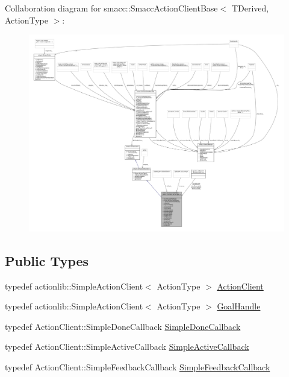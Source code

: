 Collaboration diagram for smacc\+:\+:Smacc\+Action\+Client\+Base$<$ T\+Derived, Action\+Type $>$\+:
\nopagebreak
\begin{figure}[H]
\begin{center}
\leavevmode
\includegraphics[width=350pt]{classsmacc_1_1SmaccActionClientBase__coll__graph}
\end{center}
\end{figure}
\subsection*{Public Types}
\begin{DoxyCompactItemize}
\item 
typedef actionlib\+::\+Simple\+Action\+Client$<$ Action\+Type $>$ \hyperlink{classsmacc_1_1SmaccActionClientBase_a87770be9a701846564593ce36d79cfa2}{Action\+Client}
\item 
typedef actionlib\+::\+Simple\+Action\+Client$<$ Action\+Type $>$ \hyperlink{classsmacc_1_1SmaccActionClientBase_ab63abc710289c0d22114ad3aec45c916}{Goal\+Handle}
\item 
typedef Action\+Client\+::\+Simple\+Done\+Callback \hyperlink{classsmacc_1_1SmaccActionClientBase_a2cad0a2256df0161c60af458161edbfb}{Simple\+Done\+Callback}
\item 
typedef Action\+Client\+::\+Simple\+Active\+Callback \hyperlink{classsmacc_1_1SmaccActionClientBase_ae5aaa9660a758a113f72359a5cf3884e}{Simple\+Active\+Callback}
\item 
typedef Action\+Client\+::\+Simple\+Feedback\+Callback \hyperlink{classsmacc_1_1SmaccActionClientBase_a6be950ca9b2ba07005d50731ed7b5ff8}{Simple\+Feedback\+Callback}
\end{DoxyCompactItemize}
